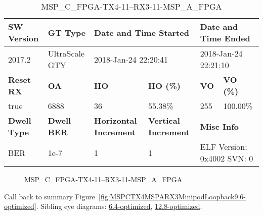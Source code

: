 \begin{table}[h]
\centering
\caption{MSP\_C\_FPGA-TX4-11--RX3-11-MSP\_A\_FPGA}
\label{tab:MSPCFPGATX411RX311MSPAFPGA9.6-optimized}
\begin{tabular}{@{}|l|l|l|l|l|l|@{}}
\toprule
\textbf{SW Version}                & \textbf{GT Type}   & \multicolumn{2}{l|}{\textbf{Date and Time Started}}            & \multicolumn{2}{l|}{\textbf{Date and Time Ended}}        \\ \midrule
2017.2                       & UltraScale GTY          & \multicolumn{2}{l|}{2018-Jan-24 22:20:41}                   & \multicolumn{2}{l|}{2018-Jan-24 22:21:10}               \\ \midrule
\textbf{Reset RX}                  & \textbf{OA} & \textbf{HO}   & \textbf{HO (\%)} & \textbf{VO} & \textbf{VO (\%)} \\ \midrule
true & 6888        & 36          & 55.38\%        & 255        & 100.00\%       \\ \midrule
\textbf{Dwell Type}                & \textbf{Dwell BER} & \textbf{Horizontal Increment} & \textbf{Vertical Increment}    & \multicolumn{2}{l|}{\textbf{Misc Info}}                  \\ \midrule
BER                            & 1e-7        & 1        & 1           & \multicolumn{2}{l|}{ELF Version: 0x4002 SVN: 0}                         \\ \bottomrule
\end{tabular}
\end{table}

\begin{figure}[h]
\caption{MSP\_C\_FPGA-TX4-11--RX3-11-MSP\_A\_FPGA} \label{fig:MSPCFPGATX411RX311MSPAFPGA9.6-optimized}
\end{figure}

Call back to summary Figure~\ref{fig:MSPCTX4MSPARX3MinipodLoopback9.6-optimized}.
Sibling eye diagrams: \hyperref[sec:MSPCFPGATX411RX311MSPAFPGA6.4-optimized]{6.4-optimized}, \hyperref[sec:MSPCFPGATX411RX311MSPAFPGA12.8-optimized]{12.8-optimized}.

\clearpage
\newpage


